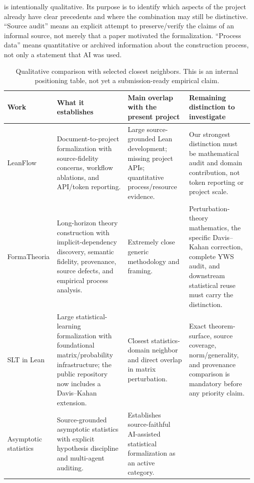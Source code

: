 \documentclass[11pt]{article}
\begin{document}
 is intentionally qualitative.  Its purpose is to identify
which aspects of the project already have clear precedents and where the
combination may still be distinctive.  ``Source audit'' means an explicit
attempt to preserve/verify the claims of an informal source, not merely that a
paper motivated the formalization.  ``Process data'' means quantitative or
archived information about the construction process, not only a statement that
AI was used.

\begin{landscape}
\begin{table}[p]
\centering
\caption{Qualitative comparison with selected closest neighbors.  This is an
internal positioning table, not yet a submission-ready empirical claim.}
\label{tab:neighbors}
\small
\renewcommand{\arraystretch}{1.22}
\begin{tabularx}{\linewidth}{@{}p{3.0cm}p{6.2cm}p{6.2cm}X@{}}
\toprule
Work & What it establishes & Main overlap with the present project & Remaining distinction to investigate \\
\midrule
LeanFlow \citep{milikic2026leanflow}
 & Document-to-project formalization with source-fidelity concerns, workflow ablations, and API/token reporting.
 & Large source-grounded Lean development; missing project APIs; quantitative process/resource evidence.
 & Our strongest distinction must be mathematical audit and domain contribution, not token reporting or project scale. \\
FormaTheoria \citep{nie2026formatheoria}
 & Long-horizon theory construction with implicit-dependency discovery, semantic fidelity, provenance, source defects, and empirical process analysis.
 & Extremely close generic methodology and framing.
 & Perturbation-theory mathematics, the specific Davis--Kahan correction, complete YWS audit, and downstream statistical reuse must carry the distinction. \\
SLT in Lean \citep{zhang2026slt,zhang2026sltrepo}
 & Large statistical-learning formalization with foundational matrix/probability infrastructure; the public repository now includes a Davis--Kahan extension.
 & Closest statistics-domain neighbor and direct overlap in matrix perturbation.
 & Exact theorem-surface, source coverage, norm/generality, and provenance comparison is mandatory before any priority claim. \\
Asymptotic statistics \citep{wei2026asymptotic}
 & Source-grounded asymptotic statistics with explicit hypothesis discipline and multi-agent auditing.
 & Establishes source-faithful AI-assisted statistical formalization as an active category.

\end{tabularx}
\end{table}
\end{landscape}
\end{document}
